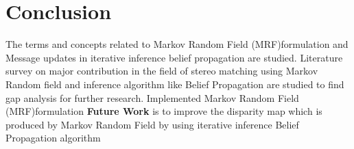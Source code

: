 \chapter{Conclusion}
The terms and concepts related to Markov Random Field (MRF)formulation and Message updates in iterative inference belief propagation are studied.\newline
Literature survey on  major contribution in the field of stereo matching using  Markov Random field and inference algorithm like Belief Propagation are studied to find gap analysis for further research. \newline
Implemented  Markov Random Field (MRF)formulation\newline
\textbf{Future Work} is
to improve the disparity map which is produced by Markov Random Field by  using  iterative inference  Belief Propagation algorithm 